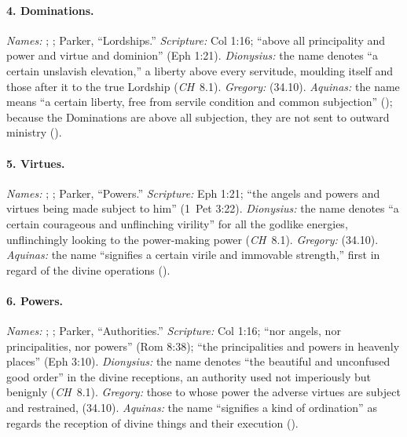 \paragraph{4. Dominations.} \emph{Names:} ;
; Parker, ``Lordships.'' \emph{Scripture:} Col 1:16;
``above all principality and power and virtue and dominion'' (Eph
1:21). \emph{Dionysius:} the name denotes ``a certain unslavish
elevation,'' a liberty above every servitude, moulding itself and those
after it to the true Lordship (\emph{CH}~8.1). \emph{Gregory:}
 (34.10). \emph{Aquinas:} the name
means ``a certain liberty, free from servile condition and common
subjection'' (); because the Dominations are
above all subjection, they are not sent to outward ministry ().

\paragraph{5. Virtues.} \emph{Names:} ; ;
Parker, ``Powers.'' \emph{Scripture:} Eph 1:21; ``the angels and powers
and virtues being made subject to him'' (1~Pet 3:22). \emph{Dionysius:}
the name denotes ``a certain courageous and unflinching virility'' for
all the godlike energies, unflinchingly looking to the power-making
power (\emph{CH}~8.1). \emph{Gregory:}  (34.10). \emph{Aquinas:} the name ``signifies a
certain virile and immovable strength,'' first in regard of the divine
operations ().

\paragraph{6. Powers.} \emph{Names:} ;
; Parker, ``Authorities.'' \emph{Scripture:} Col 1:16;
``nor angels, nor principalities, nor powers'' (Rom 8:38); ``the
principalities and powers in heavenly places'' (Eph 3:10).
\emph{Dionysius:} the name denotes ``the beautiful and unconfused good
order'' in the divine receptions, an authority used not imperiously but
benignly (\emph{CH}~8.1). \emph{Gregory:} those to whose power the
adverse virtues are subject and restrained,  (34.10). \emph{Aquinas:} the name ``signifies a kind of
ordination'' as regards the reception of divine things and their
execution ().

